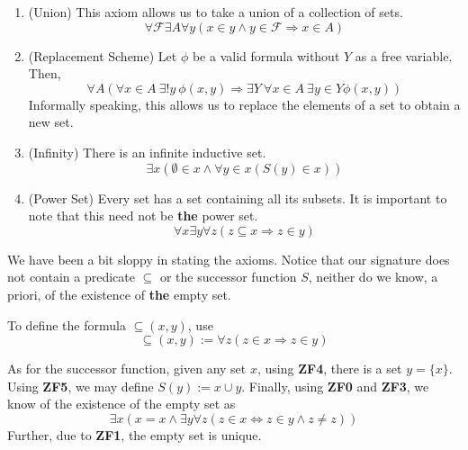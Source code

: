 \begin{enumerate}[label=\bfseries ZF\arabic*]
    \item (Union) This axiom allows us to take a union of a collection of sets.
    \begin{equation*}
        \forall\mathscr F\exists A\forall y(x\in y\wedge y\in\mathscr F\Longrightarrow x\in A)
    \end{equation*}

    \item (Replacement Scheme) Let $\phi$ be a valid formula without $Y$ as a free variable. Then, 
    \begin{equation*}
        \forall A(\forall x\in A~\exists!y~\phi(x,y)\Longrightarrow\exists Y~\forall x\in A~\exists y\in Y\phi(x,y))
    \end{equation*}
    Informally speaking, this allows us to replace the elements of a set to obtain a new set.

    \item (Infinity) There is an infinite inductive set.
    \begin{equation*}
        \exists x(\emptyset\in x\wedge\forall y\in x(S(y)\in x))
    \end{equation*}

    \item (Power Set) Every set has a set containing all its subsets. It is important to note that this need not be \textbf{the} power set.
    \begin{equation*}
        \forall x\exists y\forall z(z\subseteq x\Longrightarrow z\in y)
    \end{equation*}
\end{enumerate}

We have been a bit sloppy in stating the axioms. Notice that our signature does not contain a predicate $\subseteq$ or the successor function $S$, neither do we know, a priori, of the existence of \textbf{the} empty set.

To define the formula $\subseteq(x,y)$, use 
\begin{equation*}
    \subseteq(x,y) := \forall z(z\in x\Longrightarrow z\in y)
\end{equation*}

As for the successor function, given any set $x$, using \textbf{ZF4}, there is a set $y = \{x\}$. Using \textbf{ZF5}, we may define $S(y) := x\cup y$. Finally, using \textbf{ZF0} and \textbf{ZF3}, we know of the existence of the empty set as 
\begin{equation*}
    \exists x(x = x\wedge\exists y\forall z(z\in x\Longleftrightarrow z\in y\wedge z\ne z))
\end{equation*}
Further, due to \textbf{ZF1}, the empty set is unique.

